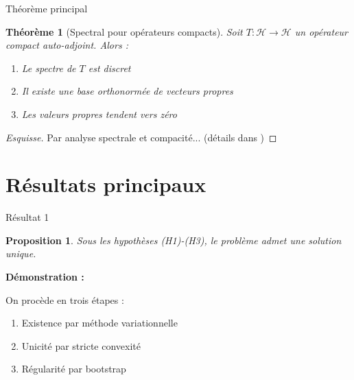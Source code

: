 \documentclass[11pt, aspectratio=169, xcolor={svgnames}]{beamer}
\newtheorem{theoreme}{Théorème}
\newtheorem{proposition}{Proposition}
\theoremstyle{definition}
\begin{document}
\begin{frame}{Théorème principal}
  \begin{theoreme}[Spectral pour opérateurs compacts]
    Soit $T : \mathcal{H} \to \mathcal{H}$ un opérateur compact auto-adjoint. Alors :
    \begin{enumerate}
      \item Le spectre de $T$ est discret
      \item Il existe une base orthonormée de vecteurs propres
      \item Les valeurs propres tendent vers zéro
    \end{enumerate}
  \end{theoreme}

  \vspace{0.5em}

  \begin{proof}[Esquisse]
    Par analyse spectrale et compacité... (détails dans \cite{reference3})
  \end{proof}
\end{frame}

\section{Résultats principaux}

\begin{frame}{Résultat 1}
  \begin{proposition}
    Sous les hypothèses (H1)-(H3), le problème admet une solution unique.
  \end{proposition}

  \textbf{Démonstration :}

  On procède en trois étapes :
  \begin{enumerate}
    \item Existence par méthode variationnelle
    \item Unicité par stricte convexité
    \item Régularité par bootstrap
  \end{enumerate}
\end{frame}
\end{document}
